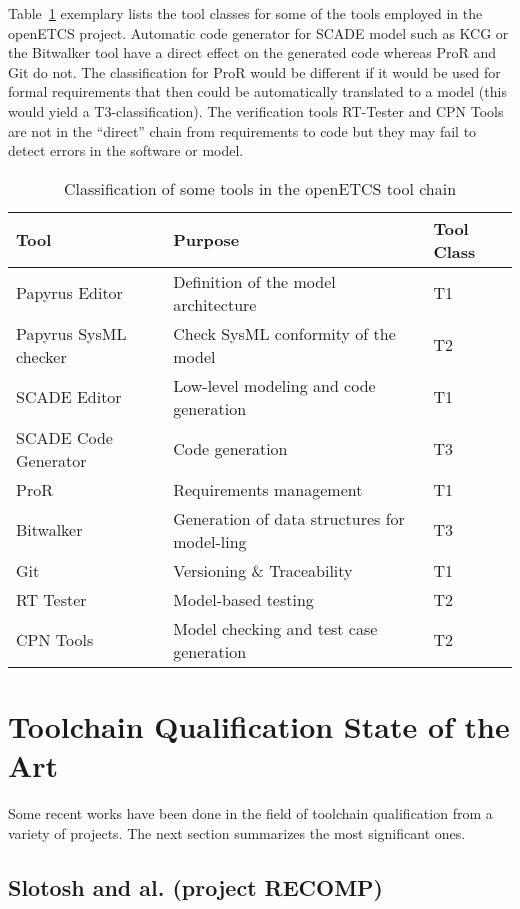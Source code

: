 Table~\ref{tab:oetcs_tool_classification} exemplary lists the tool
classes for some of the tools employed in the openETCS
project. Automatic code generator for SCADE model such as KCG or the
Bitwalker tool have a direct effect on the generated code whereas ProR
and Git do not. The classification for ProR would be different if it
would be used for formal requirements that then could be automatically
translated to a model (this would yield a T3-classification). The
verification tools RT-Tester and CPN Tools are not in the ``direct''
chain from requirements to code but they may fail to detect errors in
the software or model.

\begin{table}[h]
\begin{center}
\begin{tabular}{lll}\toprule
Tool&Purpose&Tool Class\\\midrule
Papyrus Editor &Definition of the model architecture&T1\\
Papyrus SysML checker & Check SysML conformity of the model &T2\\
SCADE Editor &Low-level modeling and code generation&T1\\
SCADE Code Generator & Code generation&T3\\
ProR&Requirements management&T1\\
Bitwalker&Generation of data structures for model-ling&T3\\
Git&Versioning \& Traceability&T1\\
RT Tester&Model-based testing&T2\\
CPN Tools&Model checking and test case generation&T2\\
\bottomrule
\end{tabular}
\end{center}
\caption{Classification of some tools in the openETCS tool chain}
\label{tab:oetcs_tool_classification}
\end{table}
 
\section{Toolchain Qualification State of the Art}
\label{sec-1-2}
Some recent works have been done in the field of toolchain
qualification from a variety of projects. The next section summarizes
the most significant ones.

\subsection{Slotosh and al. (project RECOMP)}
\label{sec:slotosh-approach}

